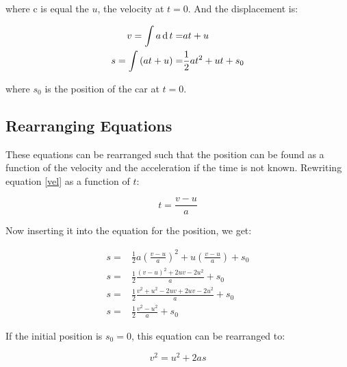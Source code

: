where c is equal the $u$, the velocity at $t=0$. And the displacement is:

 \begin{eqnarray}

v = \int a \d t =& at + u\\

s = \int \left(at + u\right) =& \frac{1}{2} a t^2 + u t + s_0

\label{s}

\end{eqnarray}

where $s_0$ is the position of the car at $t=0$. 



\subsection{Rearranging Equations}

These equations can be rearranged such that the position can be found as a function of the velocity and the acceleration if the time is not known. Rewriting equation \ref{vel} as a function of $t$:

  \begin{equation}

t = \frac{v-u}{a}

\end{equation}

Now inserting it into the equation for the position, we get:

  \begin{eqnarray}

s =& \frac{1}{2} a \left(\frac{v-u}{a}\right)^2 + u\left(\frac{v-u}{a}\right) + s_0\\

s =& \frac{1}{2}\frac{(v-u)^2 + 2uv - 2u^2}{a} + s_0\\

s =& \frac{1}{2}\frac{v^2 + u^2 - 2uv + 2uv - 2u^2}{a} + s_0\\

s =& \frac{1}{2} \frac{v^2 - u^2}{a} + s_0

\end{eqnarray}

If the initial position is $s_0=0$, this equation can be rearranged to:

  \begin{equation}

v^2 = u^2 + 2as

\end{equation}

 

 

 
